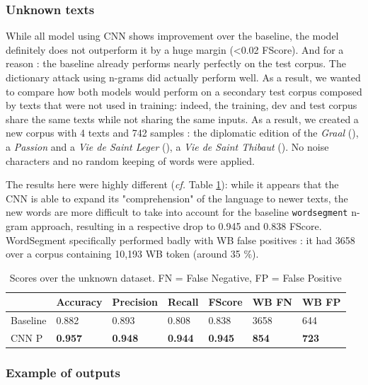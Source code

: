 \documentclass{jdmdh}
\begin{document}
\subsubsection{Unknown texts}

While all model using CNN shows improvement over the baseline, the model definitely does not outperform it by a huge margin (\textless 0.02 FScore). And for a reason : the baseline already performs nearly perfectly on the test corpus. The dictionary attack using n-grams did actually perform well. As a result, we wanted to compare how both models would perform on a secondary test corpus composed by texts that were not used in training: indeed, the training, dev and test corpus share the same texts while not sharing the same inputs. As a result, we created a new corpus with 4 texts and 742 samples : the diplomatic edition of the \textit{Graal} (\citet{graal}), a \textit{Passion} and a \textit{Vie de Saint Leger}  (\citet{old_french_corpus}), a \textit{Vie de Saint Thibaut} (\citet{theobaldus}). No noise characters and no random keeping of words were applied.

The results here were highly different (\textit{cf.} Table \ref{tab:scores_unknown}): while it appears that the CNN is able to expand its "comprehension" of the language to newer texts, the new words are more difficult to take into account for the baseline \texttt{wordsegment} n-gram approach, resulting in a respective drop to 0.945 and 0.838 FScore. WordSegment specifically performed badly with WB false positives : it had 3658 over a corpus containing 10,193 WB token (around 35 \%).

\begin{table}[!ht]
\centering
\begin{tabular}{lllllll}
\hline
 & Accuracy & Precision & Recall & FScore & WB FN & WB FP \\ \hline
Baseline & 0.882 & 0.893 & 0.808 & 0.838 & 3658 & 644 \\
CNN P & \textbf{0.957} & \textbf{0.948} & \textbf{0.944} & \textbf{0.945} & \textbf{854} & \textbf{723} \\ \hline
\end{tabular}
\caption{Scores over the unknown dataset. FN = False Negative, FP = False Positive}
\label{tab:scores_unknown}
\end{table}

\subsubsection{Example of outputs}
\end{document}
